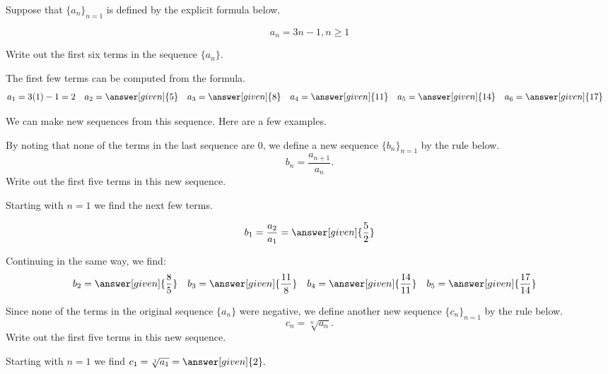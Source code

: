 \documentclass{ximera}
\begin{document}
\begin{example}
Suppose that $\{a_n\}_{n=1}$ is defined by the explicit formula below.

\[
a_n = 3n-1, n \geq 1
\]

Write out the first six terms in the sequence $\{a_n\}$.
\begin{explanation}
  The first few terms can be computed from the formula.
    \begin{align*}
      a_1 &= 3(1)-1=2 & 
      a_2 &= \answer[given]{5} & 
      a_3 &= \answer[given]{8} & 
      a_4 &= \answer[given]{11} & 
      a_5 &= \answer[given]{14}  & 
      a_6 &= \answer[given]{17} 
    \end{align*}
\end{explanation}


We can make new sequences from this sequence.  Here are a few examples.

\begin{question}
By noting that none of the terms in the last sequence are $0$, we
define a new sequence $\{b_n\}_{n=1}$ by the rule below.
\[
b_n = \frac{a_{n+1}}{a_n}. 
\]
Write out the first five terms in this new sequence.

\begin{explanation}
Starting with $n=1$ we find the next few terms.

\[      b_1 = \frac{a_2}{a_1} = \answer[given]{\frac{5}{2}}       \]
      
Continuing in the same way, we find:     
     \begin{align*}
      	b_2 &=  \answer[given]{\frac{8}{5}}  & 
	b_3 &= \answer[given]{\frac{11}{8}}  & 
	b_4 &= \answer[given]{\frac{14}{11}}  & 
	b_5 &=  \answer[given]{\frac{17}{14}}  & 
    \end{align*}
    
\end{explanation}
    
\end{question}

\begin{question}

Since none of the terms in the original sequence $\{a_n\}$ were
negative, we define another new sequence $\{c_n\}_{n=1}$ by the rule below.
\[
c_n = \sqrt[n]{a_n} .
\]
Write out the first five terms in this new sequence.

\begin{explanation}
Starting with $n=1$ we find  $c_1 = \sqrt[1]{a_1} = \answer[given]{2}.$
      

\end{explanation}
\end{question}
\end{example}
\end{document}
